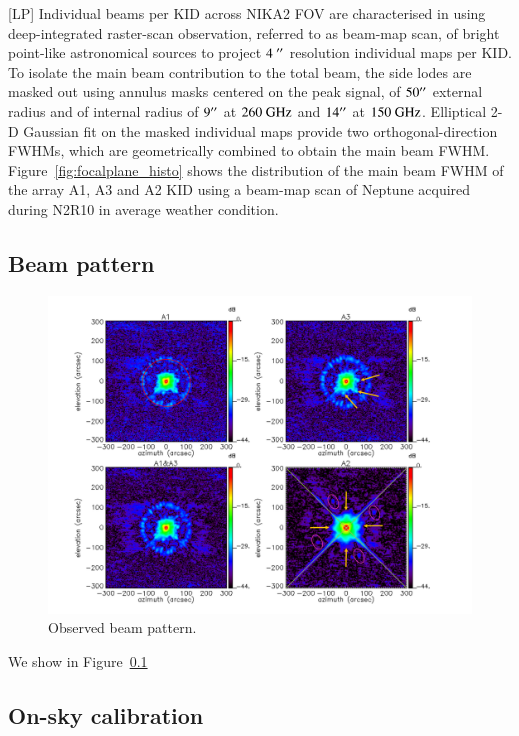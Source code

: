 \documentclass[]{aa} %
\begin{document}
[LP]
Individual beams per KID across NIKA2 FOV are characterised in using
deep-integrated raster-scan observation, referred to as beam-map scan, of bright point-like
astronomical sources to project $4~\hbox{$^{\prime\prime}$}$ resolution individual maps
per KID. To isolate the main beam contribution to the total beam, the
side lodes are masked out using annulus masks centered on the peak
signal, of $50\hbox{$^{\prime\prime}$}$ external radius and of internal radius of
$9\hbox{$^{\prime\prime}$}$ at $260~\rm{GHz}$ and $14\hbox{$^{\prime\prime}$}$ at
$150~\rm{GHz}$. Elliptical 2-D Gaussian fit on the masked individual
maps provide two orthogonal-direction FWHMs, which are geometrically
combined to obtain the main beam FWHM. Figure~\ref{fig:focalplane_histo} shows the distribution of the main
beam FWHM of the array A1, A3 and A2 KID using a beam-map scan of Neptune acquired during N2R10 in average weather condition.





\subsection{Beam pattern}

\begin{figure}[h]
   \centering
    \includegraphics[width=0.9\linewidth]{Beams_features.pdf}
     
      \caption{Observed beam pattern.}
         \label{fig:beampattern}
\end{figure}

We show in Figure~\ref{}

\subsection{On-sky calibration}
\label{On-sky calibration}
\end{document}
